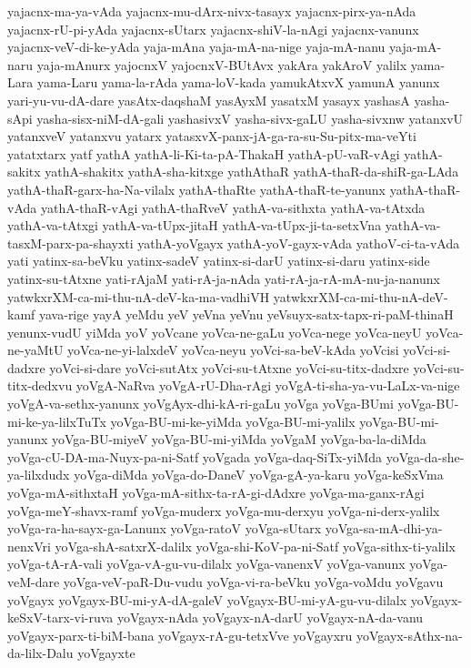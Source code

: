 {yajacnx-ma-ya-vAda
yajacnx-mu-dArx-nivx-tasayx
yajacnx-pirx-ya-nAda
yajacnx-rU-pi-yAda
yajacnx-sUtarx
yajacnx-shiV-la-nAgi
yajacnx-vanunx
yajacnx-veV-di-ke-yAda
yaja-mAna
yaja-mA-na-nige
yaja-mA-nanu
yaja-mA-naru
yaja-mAnurx
yajocnxV
yajocnxV-BUtAvx
yakAra
yakAroV
yalilx
yama-Lara
yama-Laru
yama-la-rAda
yama-loV-kada
yamukAtxvX
yamunA
yanunx
yari-yu-vu-dA-dare
yasAtx-daqshaM
yasAyxM
yasatxM
yasayx
yashasA
yasha-sApi
yasha-sisx-niM-dA-gali
yashasivxV
yasha-sivx-gaLU
yasha-sivxnw
yatanxvU
yatanxveV
yatanxvu
yatarx
yatasxvX-panx-jA-ga-ra-su-Su-pitx-ma-veYti
yatatxtarx
yatf
yathA
yathA-li-Ki-ta-pA-ThakaH
yathA-pU-vaR-vAgi
yathA-sakitx
yathA-shakitx
yathA-sha-kitxge
yathAthaR
yathA-thaR-da-shiR-ga-LAda
yathA-thaR-garx-ha-Na-vilalx
yathA-thaRte
yathA-thaR-te-yanunx
yathA-thaR-vAda
yathA-thaR-vAgi
yathA-thaRveV
yathA-va-sithxta
yathA-va-tAtxda
yathA-va-tAtxgi
yathA-va-tUpx-jitaH
yathA-va-tUpx-ji-ta-setxVna
yathA-va-tasxM-parx-pa-shayxti
yathA-yoVgayx
yathA-yoV-gayx-vAda
yathoV-ci-ta-vAda
yati
yatinx-sa-beVku
yatinx-sadeV
yatinx-si-darU
yatinx-si-daru
yatinx-side
yatinx-su-tAtxne
yati-rAjaM
yati-rA-ja-nAda
yati-rA-ja-rA-mA-nu-ja-nanunx
yatwkxrXM-ca-mi-thu-nA-deV-ka-ma-vadhiVH
yatwkxrXM-ca-mi-thu-nA-deV-kamf
yava-rige
yayA
yeMdu
yeV
yeVna
yeVnu
yeVsuyx-satx-tapx-ri-paM-thinaH
yenunx-vudU
yiMda
yoV
yoVcane
yoVca-ne-gaLu
yoVca-nege
yoVca-neyU
yoVca-ne-yaMtU
yoVca-ne-yi-lalxdeV
yoVca-neyu
yoVci-sa-beV-kAda
yoVcisi
yoVci-si-dadxre
yoVci-si-dare
yoVci-sutAtx
yoVci-su-tAtxne
yoVci-su-titx-dadxre
yoVci-su-titx-dedxvu
yoVgA-NaRva
yoVgA-rU-Dha-rAgi
yoVgA-ti-sha-ya-vu-LaLx-va-nige
yoVgA-va-sethx-yanunx
yoVgAyx-dhi-kA-ri-gaLu
yoVga
yoVga-BUmi
yoVga-BU-mi-ke-ya-lilxTuTx
yoVga-BU-mi-ke-yiMda
yoVga-BU-mi-yalilx
yoVga-BU-mi-yanunx
yoVga-BU-miyeV
yoVga-BU-mi-yiMda
yoVgaM
yoVga-ba-la-diMda
yoVga-cU-DA-ma-Nuyx-pa-ni-Satf
yoVgada
yoVga-daq-SiTx-yiMda
yoVga-da-she-ya-lilxdudx
yoVga-diMda
yoVga-do-DaneV
yoVga-gA-ya-karu
yoVga-keSxVma
yoVga-mA-sithxtaH
yoVga-mA-sithx-ta-rA-gi-dAdxre
yoVga-ma-ganx-rAgi
yoVga-meY-shavx-ramf
yoVga-muderx
yoVga-mu-derxyu
yoVga-ni-derx-yalilx
yoVga-ra-ha-sayx-ga-Lanunx
yoVga-ratoV
yoVga-sUtarx
yoVga-sa-mA-dhi-ya-nenxVri
yoVga-shA-satxrX-dalilx
yoVga-shi-KoV-pa-ni-Satf
yoVga-sithx-ti-yalilx
yoVga-tA-rA-vali
yoVga-vA-gu-vu-dilalx
yoVga-vanenxV
yoVga-vanunx
yoVga-veM-dare
yoVga-veV-paR-Du-vudu
yoVga-vi-ra-beVku
yoVga-voMdu
yoVgavu
yoVgayx
yoVgayx-BU-mi-yA-dA-galeV
yoVgayx-BU-mi-yA-gu-vu-dilalx
yoVgayx-keSxV-tarx-vi-ruva
yoVgayx-nAda
yoVgayx-nA-darU
yoVgayx-nA-da-vanu
yoVgayx-parx-ti-biM-bana
yoVgayx-rA-gu-tetxVve
yoVgayxru
yoVgayx-sAthx-na-da-lilx-Dalu
yoVgayxte
}
